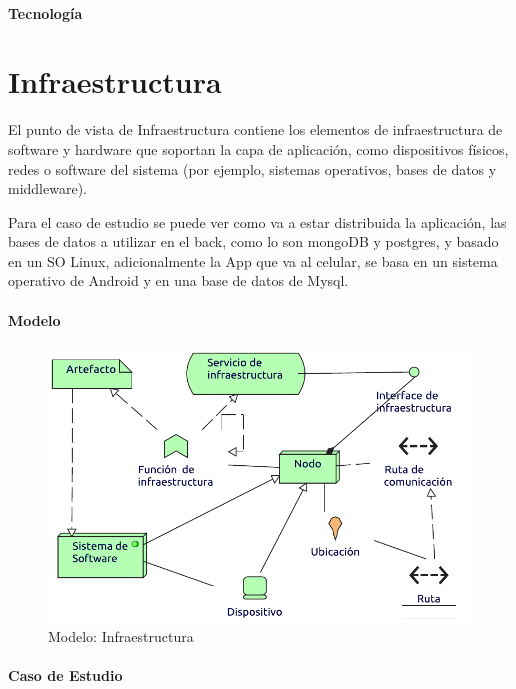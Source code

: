 \paragraph{Tecnología}

\section{Infraestructura}
El punto de vista de Infraestructura contiene los elementos de infraestructura de software y hardware que soportan la capa de aplicación, como dispositivos físicos, redes o software del sistema (por ejemplo, sistemas operativos, bases de datos y middleware).  \vspace{\baselineskip}

Para el caso de estudio se puede ver como va a estar distribuida la aplicación, las bases de datos a utilizar en el back, como lo son mongoDB y postgres, y basado en un SO Linux, adicionalmente la App que va al celular, se basa en un sistema operativo de Android y en una base de datos de Mysql.

\paragraph{Modelo}
\begin{figure}[h!]
	\centering
	\includegraphics[width=0.8\linewidth]{Desarrollo/ArquitecturaEmpresarial/Tecnologia/imgs/insfraestructuraMetamodelo.pdf}
	\caption{Modelo: Infraestructura}
\end{figure}
\newpage
\paragraph{Caso de Estudio}

